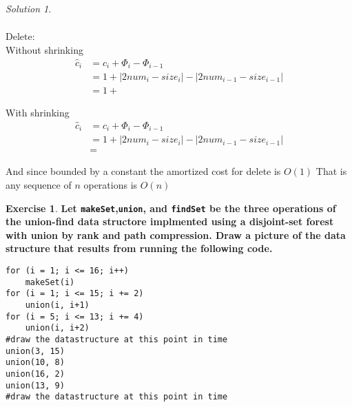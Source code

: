 \documentclass[a4paper,twoside=false,abstract=false,numbers=noenddot,
titlepage=false,headings=small,parskip=half,version=last]{scrartcl}
\theoremstyle{definition}
\newtheorem{exercise}{Exercise}
\theoremstyle{remark}
\newtheorem*{solution}{Solution}
\begin{document}
\begin{solution}
\begin{equation}
\begin{split}
\end{split}
\end{equation}

Delete:\\


Without shrinking \\
\begin{equation}
\begin{split}
    \hat{c}_i & = c_i + \Phi_i - \Phi_{i-1} \\
              & = 1 + |2num_i-size_i|-|2num_{i-1}-size_{i-1}| \\
              & = 1 +  
\end{split}
\end{equation}

With shrinking \\
\begin{equation}
\begin{split}
    \hat{c}_i & = c_i + \Phi_i - \Phi_{i-1} \\
              & = 1 + |2num_i-size_i|-|2num_{i-1}-size_{i-1}| \\
              & =  
\end{split}
\end{equation}




And since bounded by a constant the amortized cost for delete is $O(1)$
That is any sequence of $n$ operations is $O(n)$

\end{solution}
\begin{exercise}
{\bf
Let \verb+makeSet+,\verb+union+, and \verb+findSet+ be the three operations of the union-find data structore implmented using a disjoint-set forest with union by rank and path compression.
Draw a picture of the data structure that results from running the following code. 
\begin{verbatim}
for (i = 1; i <= 16; i++)
    makeSet(i)
for (i = 1; i <= 15; i += 2)
    union(i, i+1)
for (i = 5; i <= 13; i += 4)
    union(i, i+2)
#draw the datastructure at this point in time
union(3, 15)
union(10, 8)
union(16, 2)
union(13, 9)
#draw the datastructure at this point in time
\end{verbatim}
}
\end{exercise}
\end{document}
